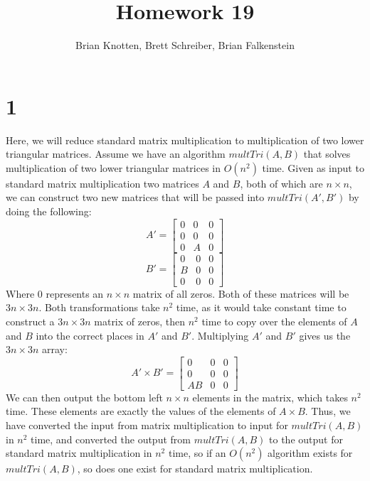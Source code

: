 \documentclass[letterpaper,notitlepage,twoside]{article}
\begin{document}
\title{Homework 19}
\author{Brian Knotten, Brett Schreiber, Brian Falkenstein}
\maketitle
\section*{1}
Here, we will reduce standard matrix multiplication to multiplication of two lower triangular matrices. Assume we have an algorithm $multTri(A, B)$ that solves multiplication of two lower triangular matrices in $O(n^2)$ time. Given as input to standard matrix multiplication two matrices $A$ and $B$, both of which are $n\times n$, we can construct two new matrices that will be passed into $multTri(A', B')$ by doing the following: 
\[
A' = 
\begin{bmatrix}
    0 & 0 & 0 \\
    0 & 0 & 0 \\
    0 & A & 0 
\end{bmatrix}
\]
\[
B' = 
\begin{bmatrix}
    0 & 0 & 0 \\
    B & 0 & 0 \\
    0 & 0 & 0 
\end{bmatrix}
\]
Where $0$ represents an $n \times n$ matrix of all zeros. Both of these matrices will be $3n\times 3n$. Both transformations take $n^2$ time, as it would take constant time to construct a $3n\times 3n$ matrix of zeros, then $n^2$ time to copy over the elements of $A$ and $B$ into the correct places in $A'$ and $B'$. Multiplying $A'$ and $B'$ gives us the $3n \times 3n$ array: \\
\[
A' \times B' = 
\begin{bmatrix}
    0 & 0 & 0 \\
    0 & 0 & 0 \\
    AB & 0 & 0 
\end{bmatrix}
\]
We can then output the bottom left $n\times n$ elements in the matrix, which takes $n^2$ time. These elements are exactly the values of the elements of $A\times B$. Thus, we have converted the input from matrix multiplication to input for $multTri(A,B)$ in $n^2$ time, and converted the output from $multTri(A,B)$ to the output for standard matrix multiplication in $n^2$ time, so if an $O(n^2)$ algorithm exists for $multTri(A,B)$, so does one exist for standard matrix multiplication. 
\end{document}
